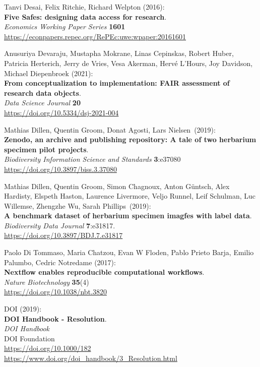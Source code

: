 \begin{thebibliography}{9}
Tanvi Desai, Felix Ritchie, Richard Welpton (2016):\\
\textbf{Five Safes: designing data access for research}.\\
\emph{Economics Working Paper Series} \textbf{1601}\\
\url{https://econpapers.repec.org/RePEc:uwe:wpaper:20161601}

Anusuriya Devaraju, Mustapha Mokrane, Linas Cepinskas, Robert Huber,
Patricia Herterich, Jerry de Vries, Vesa Akerman, Hervé L'Hours, Joy
Davidson, Michael Diepenbroek (2021): \\
\textbf{From conceptualization to implementation: FAIR assessment of research data objects}. \\
\emph{Data Science Journal} \textbf{20} \\
\url{https://doi.org/10.5334/dsj-2021-004}

Mathias Dillen, Quentin Groom, Donat Agosti, Lars Nielsen~(2019):\\
\textbf{Zenodo, an archive and publishing repository: A tale of two
herbarium specimen pilot projects}.\\
\emph{Biodiversity Information Science and Standards} \textbf{3}:e37080\\
\url{https://doi.org/10.3897/biss.3.37080}

Mathias Dillen, Quentin Groom, Simon Chagnoux, Anton Güntsch, Alex Hardisty, Elspeth Haston, Laurence Livermore, Veljo Runnel, Leif Schulman, Luc Willemse, Zhengzhe Wu, Sarah Phillips~(2019):\\
\textbf{A benchmark dataset of herbarium specimen imagfes with label data}.\\
\emph{Biodiversity Data Journal} \textbf{7}:e31817.\\
\url{https://doi.org/10.3897/BDJ.7.e31817}

Paolo Di Tommaso, Maria Chatzou, Evan W Floden, Pablo Prieto Barja, Emilio Palumbo, Cedric Notredame (2017):\\
\textbf{Nextflow enables reproducible computational workflows}.\\
\emph{Nature Biotechnology} \textbf{35}(4) \\
\url{https://doi.org/10.1038/nbt.3820}

DOI (2019): \\
\textbf{{DOI Handbook} - {Resolution}}. \\
\emph{{DOI Handbook}}\\
DOI Foundation\\
\url{https://doi.org/10.1000/182}\\
\url{https://www.doi.org/doi_handbook/3_Resolution.html}


\end{thebibliography}

